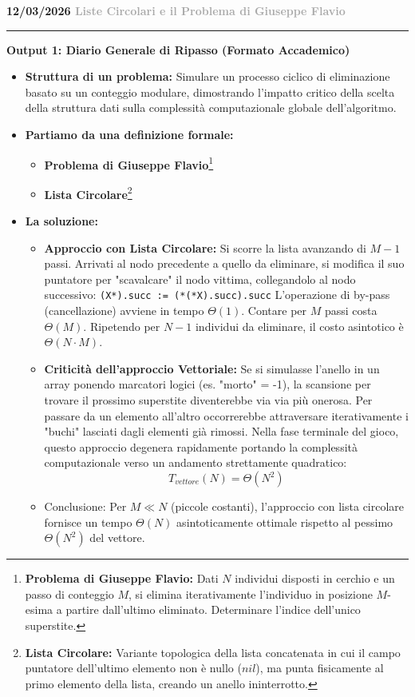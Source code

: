 \documentclass[a4paper, 11pt]{report}
\newcommand{\lezione}[2]{
\vspace{2em}
\noindent\textbf{\Large #1 \hfill \textcolor{darkgray}{#2}}
\vspace{0.5em}
\hrule
\vspace{1.5em}
}
\newcommand{\definizione}[2]{%
\textbf{#1}\footnote{\textbf{#1:} #2}%
}
\begin{document}
\lezione{12/03/2026}{Liste Circolari e il Problema di Giuseppe Flavio}
\vspace{0.5cm}
\textbf{Output 1: Diario Generale di Ripasso (Formato Accademico)}
\begin{itemize}
\item \textbf{Struttura di un problema:}
Simulare un processo ciclico di eliminazione basato su un conteggio modulare, dimostrando l'impatto critico della scelta della struttura dati sulla complessità computazionale globale dell'algoritmo.

\item \textbf{Partiamo da una definizione formale:}
\begin{itemize}
    \item \definizione{Problema di Giuseppe Flavio}{Dati $N$ individui disposti in cerchio e un passo di conteggio $M$, si elimina iterativamente l'individuo in posizione $M$-esima a partire dall'ultimo eliminato. Determinare l'indice dell'unico superstite.}
    \item \definizione{Lista Circolare}{Variante topologica della lista concatenata in cui il campo puntatore dell'ultimo elemento non è nullo ($nil$), ma punta fisicamente al primo elemento della lista, creando un anello ininterrotto.}
\end{itemize}

\item \textbf{La soluzione:}
\begin{itemize}
    \item \textbf{Approccio con Lista Circolare:} Si scorre la lista avanzando di $M-1$ passi. Arrivati al nodo precedente a quello da eliminare, si modifica il suo puntatore per "scavalcare" il nodo vittima, collegandolo al nodo successivo:
    \texttt{(X*).succ := (*(*X).succ).succ}
    L'operazione di by-pass (cancellazione) avviene in tempo $\Theta(1)$. Contare per $M$ passi costa $\Theta(M)$. Ripetendo per $N-1$ individui da eliminare, il costo asintotico è $\Theta(N \cdot M)$.
    \item \textbf{Criticità dell'approccio Vettoriale:} Se si simulasse l'anello in un array ponendo marcatori logici (es. "morto" = -1), la scansione per trovare il prossimo superstite diventerebbe via via più onerosa. Per passare da un elemento all'altro occorrerebbe attraversare iterativamente i "buchi" lasciati dagli elementi già rimossi. Nella fase terminale del gioco, questo approccio degenera rapidamente portando la complessità computazionale verso un andamento strettamente quadratico:
    \[ T_{vettore}(N) = \Theta(N^2) \]
    \item Conclusione: Per $M \ll N$ (piccole costanti), l'approccio con lista circolare fornisce un tempo $\Theta(N)$ asintoticamente ottimale rispetto al pessimo $\Theta(N^2)$ del vettore.
\end{itemize}
\end{itemize}
\end{document}
